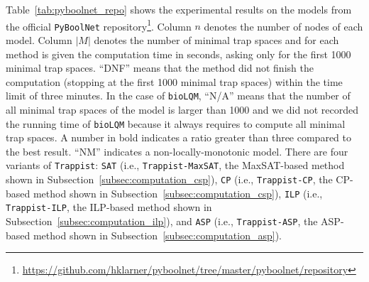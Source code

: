 \documentclass[preprint,12pt]{elsarticle}
\begin{document}
Table~\ref{tab:pyboolnet_repo} shows the experimental results on the models from the official \texttt{PyBoolNet} repository\footnote{\url{https://github.com/hklarner/pyboolnet/tree/master/pyboolnet/repository}}.
Column \(n\) denotes the number of nodes of each model.
Column \(|M|\) denotes the number of minimal trap spaces and for each method is given the computation time in seconds, asking only for the first 1000 minimal trap spaces.
``DNF'' means that the method did not finish the computation (stopping at the first 1000 minimal trap spaces) within the time limit of three minutes.
In the case of \texttt{bioLQM}, ``N/A'' means that the number of all minimal trap spaces of the model is larger than 1000 and we did not recorded the running time of \texttt{bioLQM} because it always requires to compute all minimal trap spaces.
A number in bold indicates a ratio greater than three compared to the best result.
``NM'' indicates a non-locally-monotonic model.
There are four variants of \texttt{Trappist}: \texttt{SAT} (i.e., \texttt{Trappist-MaxSAT}, the MaxSAT-based method shown in Subsection~\ref{subsec:computation_csp}), \texttt{CP} (i.e., \texttt{Trappist-CP}, the CP-based method shown in Subsection~\ref{subsec:computation_csp}), \texttt{ILP} (i.e., \texttt{Trappist-ILP}, the ILP-based method shown in Subsection~\ref{subsec:computation_ilp}), and \texttt{ASP} (i.e., \texttt{Trappist-ASP}, the ASP-based method shown in Subsection~\ref{subsec:computation_asp}).
\end{document}
